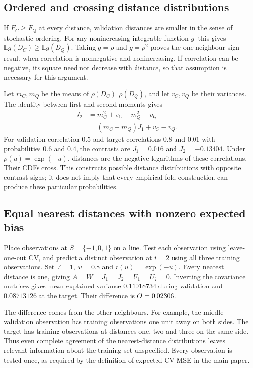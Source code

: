 \documentclass[11pt,a4paper]{article}
\newcommand{\E}{\mathbb{E}}
\begin{document}
\subsection{Ordered and crossing distance distributions}
\label{sec:order}
If $F_C\geq F_Q$ at every distance, validation distances are smaller in the sense of stochastic ordering. For any nonincreasing integrable function $g$, this gives $\E g(D_C)\geq\E g(D_Q)$. Taking $g=\rho$ and $g=\rho^2$ proves the one-neighbour sign result when correlation is nonnegative and nonincreasing. If correlation can be negative, its square need not decrease with distance, so that assumption is necessary for this argument.

Let $m_C,m_Q$ be the means of $\rho(D_C),\rho(D_Q)$, and let $v_C,v_Q$ be their variances. The identity between first and second moments gives
\begin{align*}
J_2&=m_C^2+v_C-m_Q^2-v_Q\\
   &=(m_C+m_Q)J_1+v_C-v_Q.
\end{align*}
For validation correlation $0.5$ and target correlations $0.8$ and $0.01$ with probabilities $0.6$ and $0.4$, the contrasts are $J_1=0.016$ and $J_2=-0.13404$. Under $\rho(u)=\exp(-u)$, distances are the negative logarithms of these correlations. Their CDFs cross. This constructs possible distance distributions with opposite contrast signs; it does not imply that every empirical fold construction can produce these particular probabilities.

\subsection{Equal nearest distances with nonzero expected bias}
\label{sec:counterexample}
Place observations at $S=\{-1,0,1\}$ on a line. Test each observation using leave-one-out CV, and predict a distinct observation at $t=2$ using all three training observations. Set $V=1$, $w=0.8$ and $r(u)=\exp(-u)$. Every nearest distance is one, giving $A=W=J_1=J_2=U_1=U_2=0$. Inverting the covariance matrices gives mean explained variance $0.11018734$ during validation and $0.08713126$ at the target. Their difference is $O=0.02306$.

The difference comes from the other neighbours. For example, the middle validation observation has training observations one unit away on both sides. The target has training observations at distances one, two and three on the same side. Thus even complete agreement of the nearest-distance distributions leaves relevant information about the training set unspecified. Every observation is tested once, as required by the definition of expected CV MSE in the main paper.
\end{document}
